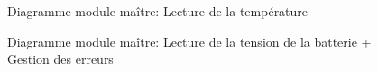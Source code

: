 		\begin{figure}[H]
			\centering
			\caption{Diagramme module maître: Lecture de la température}
			\label{fig:diagrammefonctionnelmaitrelecturetemp}
		\end{figure}

		\begin{figure}[H]
			\centering
			\caption{Diagramme module maître: Lecture de la tension de la batterie + Gestion des erreurs}
			\label{fig:diagrammefonctionnelmaitrelecturebat}
		\end{figure}


